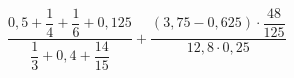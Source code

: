 \begin{ex}[type=calculate]
	\begin{condition}
		\( \dfrac{0,5+\dfrac{1}{4}+\dfrac{1}{6}+0,125}{\dfrac{1}{3}+0,4+\dfrac{14}{15}}+\dfrac{(3,75-0,625)\cdot\dfrac{48}{125}}{12,8\cdot0,25} \)
	\end{condition}
\end{ex}